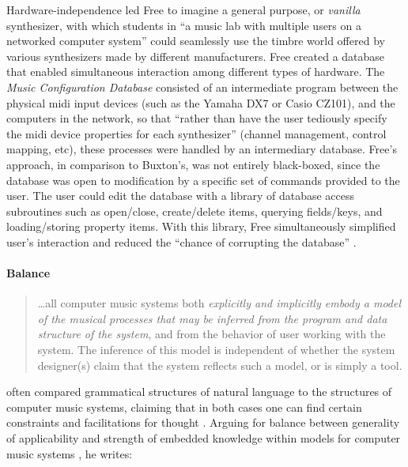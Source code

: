 Hardware-independence led Free to imagine a general purpose, or \textit{vanilla} synthesizer, with which students in ``a music lab with multiple users on a networked computer system'' \parencite[127]{DBLP:conf/icmc/FreeV88} could seamlessly use the timbre world offered by various synthesizers made by different manufacturers. Free created a database that enabled simultaneous interaction among different types of hardware. The \textit{Music Configuration Database} consisted of an intermediate program between the physical \gls{midi} input devices (such as the Yamaha DX7 or Casio CZ101), and the computers in the network, so that ``rather than have the user tediously specify the \gls{midi} device properties for each synthesizer'' \parencite[133]{DBLP:conf/icmc/FreeV88} (channel management, control mapping, etc), these processes were handled by an intermediary database. Free's approach, in comparison to Buxton's, was not entirely black-boxed, since the database was open to modification by a specific set of commands provided to the user. The user could edit the database with a library of database access subroutines such as open/close, create/delete items, querying fields/keys, and loading/storing property items. With this library, Free simultaneously simplified user's interaction and reduced the ``chance of corrupting the database'' \parencite[137]{DBLP:conf/icmc/FreeV88}. 

\paragraph{Balance}
\label{computer:balance}


\begin{quote}
	\dots all computer music systems both \textit{explicitly and implicitly embody a model of the musical processes that may be inferred from the program and data structure of the system}, and from the behavior of user working with the system. The inference of this model is independent of whether the system designer(s) claim that the system reflects such a model, or is simply a tool. \im \parencite[230-231]{Tru76:ACo}
\end{quote}

\textcites{Tru73:The}{Tru76:ACo}{Tru80:The}[Chapter~8]{Emm86:The} often compared grammatical structures of natural language to the structures of computer music systems, claiming that in both cases one can find certain constraints and facilitations for thought \parencite[156]{Emm86:The}. Arguing for balance between generality of applicability and strength of embedded knowledge within models for computer music systems , he writes:

